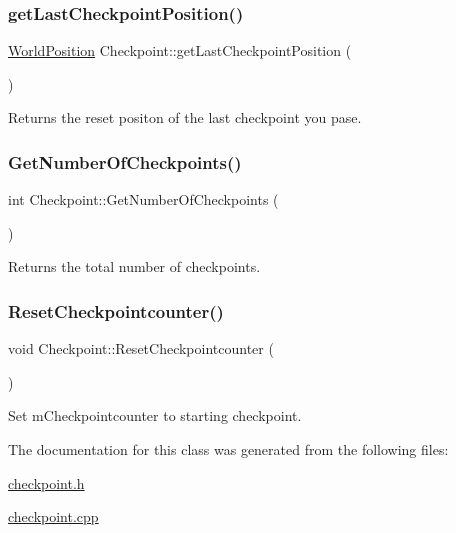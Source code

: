 \subsubsection{\texorpdfstring{getLastCheckpointPosition()}{getLastCheckpointPosition()}}
{\footnotesize\ttfamily \mbox{\hyperlink{class_world_position}{World\+Position}} Checkpoint\+::get\+Last\+Checkpoint\+Position (\begin{DoxyParamCaption}{ }\end{DoxyParamCaption})}



Returns the reset positon of the last checkpoint you pase. 

\mbox{\label{class_checkpoint_afcc076878559f9e2d738d79759c462f0}} 
\subsubsection{\texorpdfstring{GetNumberOfCheckpoints()}{GetNumberOfCheckpoints()}}
{\footnotesize\ttfamily int Checkpoint\+::\+Get\+Number\+Of\+Checkpoints (\begin{DoxyParamCaption}{ }\end{DoxyParamCaption})}



Returns the total number of checkpoints. 

\mbox{\label{class_checkpoint_aa0dd569d6b9091e07500891692b4d520}} 
\subsubsection{\texorpdfstring{ResetCheckpointcounter()}{ResetCheckpointcounter()}}
{\footnotesize\ttfamily void Checkpoint\+::\+Reset\+Checkpointcounter (\begin{DoxyParamCaption}{ }\end{DoxyParamCaption})}



Set m\+Checkpointcounter to starting checkpoint. 



The documentation for this class was generated from the following files\+:\begin{DoxyCompactItemize}
\item 
\mbox{\hyperlink{checkpoint_8h}{checkpoint.\+h}}\item 
\mbox{\hyperlink{checkpoint_8cpp}{checkpoint.\+cpp}}\end{DoxyCompactItemize}
